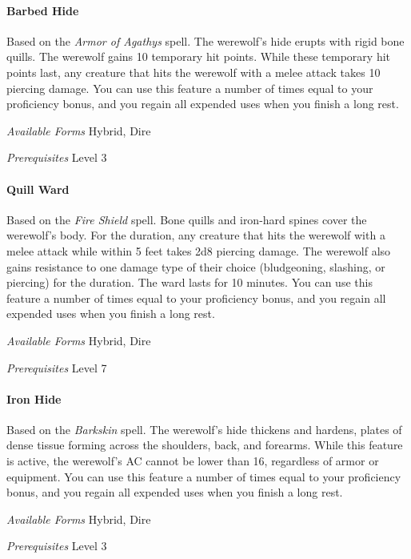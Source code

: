 \documentclass[twocolumn]{dndbook}
\begin{document}
\paragraph*{Barbed Hide}
Based on the \emph{Armor of Agathys} spell.
The werewolf's hide erupts with rigid bone quills.
The werewolf gains 10 temporary hit points.
While these temporary hit points last, any creature that hits the werewolf with a melee attack takes 10 piercing damage.
You can use this feature a number of times equal to your proficiency bonus, and you regain all expended uses when you finish a long rest.\par
\emph{Available Forms} Hybrid, Dire\par
\emph{Prerequisites} Level 3\par

\paragraph*{Quill Ward}
Based on the \emph{Fire Shield} spell.
Bone quills and iron-hard spines cover the werewolf's body.
For the duration, any creature that hits the werewolf with a melee attack while within 5 feet takes 2d8 piercing damage.
The werewolf also gains resistance to one damage type of their choice (bludgeoning, slashing, or piercing) for the duration.
The ward lasts for 10 minutes.
You can use this feature a number of times equal to your proficiency bonus, and you regain all expended uses when you finish a long rest.\par
\emph{Available Forms} Hybrid, Dire\par
\emph{Prerequisites} Level 7\par

\paragraph*{Iron Hide}
Based on the \emph{Barkskin} spell.
The werewolf's hide thickens and hardens, plates of dense tissue forming across the shoulders, back, and forearms.
While this feature is active, the werewolf's AC cannot be lower than 16, regardless of armor or equipment.
You can use this feature a number of times equal to your proficiency bonus, and you regain all expended uses when you finish a long rest.\par
\emph{Available Forms} Hybrid, Dire\par
\emph{Prerequisites} Level 3\par
\end{document}
